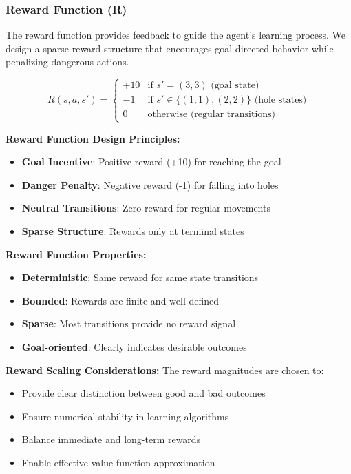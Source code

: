 \documentclass[12pt]{article}
\begin{document}
{{{\subsubsection{Reward Function (R)}

The reward function provides feedback to guide the agent's learning process. We design a sparse reward structure that encourages goal-directed behavior while penalizing dangerous actions.

\begin{equation}
R(s, a, s') = \begin{cases}
+10 & \text{if } s' = (3, 3) \text{ (goal state)} \\
-1 & \text{if } s' \in \{(1, 1), (2, 2)\} \text{ (hole states)} \\
0 & \text{otherwise (regular transitions)}
\end{cases}
\end{equation}

\textbf{Reward Function Design Principles:}
\begin{itemize}
    \item \textbf{Goal Incentive}: Positive reward (+10) for reaching the goal
    \item \textbf{Danger Penalty}: Negative reward (-1) for falling into holes
    \item \textbf{Neutral Transitions}: Zero reward for regular movements
    \item \textbf{Sparse Structure}: Rewards only at terminal states
\end{itemize}

\textbf{Reward Function Properties:}
\begin{itemize}
    \item \textbf{Deterministic}: Same reward for same state transitions
    \item \textbf{Bounded}: Rewards are finite and well-defined
    \item \textbf{Sparse}: Most transitions provide no reward signal
    \item \textbf{Goal-oriented}: Clearly indicates desirable outcomes
\end{itemize}

\textbf{Reward Scaling Considerations:}
The reward magnitudes are chosen to:
\begin{itemize}
    \item Provide clear distinction between good and bad outcomes
    \item Ensure numerical stability in learning algorithms
    \item Balance immediate and long-term rewards
    \item Enable effective value function approximation
\end{itemize}

}}}
\end{document}
